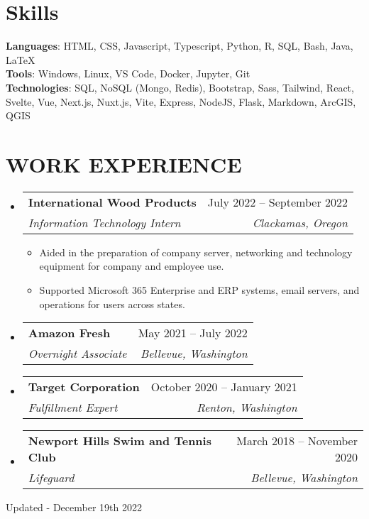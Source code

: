 \documentclass[letterpaper,11pt]{article}
\makeatletter
\newcommand{\resumeItem}[1]{
  \item\small{
    {#1 \vspace{-2pt}}
  }
}
\newcommand{\resumeSubheading}[4]{
  \vspace{-2pt}\item
    \begin{tabular*}{0.97\textwidth}[t]{l@{\extracolsep{\fill}}r}
      \textbf{#1} & #2 \\
      \textit{\small#3} & \textit{\small #4} \\
    \end{tabular*}\vspace{-7pt}
}
\newcommand{\resumeSubHeadingListStart}{\begin{itemize}[leftmargin=0.15in, label={}]}
\newcommand{\resumeSubHeadingListEnd}{\end{itemize}}
\newcommand{\resumeItemListStart}{\begin{itemize}}
\newcommand{\resumeItemListEnd}{\end{itemize}\vspace{-5pt}}
\makeatother
\begin{document}
\section{Skills}
 \begin{itemize}[leftmargin=0.15in, label={}]
    \small{\item{
     \textbf{Languages}{: HTML, CSS, Javascript, Typescript, Python, R, SQL, Bash, Java, LaTeX} \\
     \textbf{Tools}{: Windows, Linux, VS Code, Docker, Jupyter, Git} \\
     \textbf{Technologies}{: SQL, NoSQL (Mongo, Redis), Bootstrap, Sass, Tailwind, React, Svelte, Vue, Next.js, Nuxt.js, Vite, Express, NodeJS, Flask, Markdown, ArcGIS, QGIS} \\
    }}
 \end{itemize}
 \vspace{-16pt}

\section{WORK EXPERIENCE}
  \resumeSubHeadingListStart

    \resumeSubheading
      {International Wood Products}{July 2022 -- September 2022}
      {Information Technology Intern}{Clackamas, Oregon}
      \resumeItemListStart
        \resumeItem{Aided in the preparation of company server, networking and technology equipment for company and employee use.}
        \resumeItem{Supported Microsoft 365 Enterprise and ERP systems, email servers, and operations for users across states.}
      \resumeItemListEnd

    \resumeSubheading
      {Amazon Fresh}{May 2021 -- July 2022}
      {Overnight Associate}{Bellevue, Washington}

    \resumeSubheading
      {Target Corporation}{October 2020 -- January 2021}
      {Fulfillment Expert}{Renton, Washington}

    \resumeSubheading
      {Newport Hills Swim and Tennis Club}{March 2018 -- November 2020}
      {Lifeguard}{Bellevue, Washington}

  \resumeSubHeadingListEnd
\vspace{-16pt}

\begin{center}
    \tiny Updated - December 19th 2022
\end{center}
\end{document}
